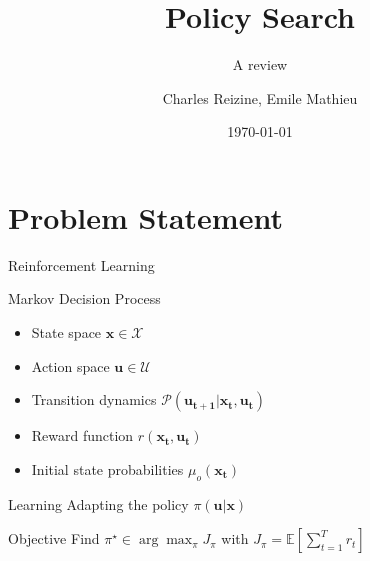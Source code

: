 \documentclass[10pt]{beamer}
\title{Policy Search}
\subtitle{A review}
\date{\today}
\author{Charles Reizine, Emile Mathieu}
\institute{Ecole des Ponts ParisTech}
\begin{document}
\maketitle


\section{Problem Statement}

\begin{frame}{Reinforcement Learning}

\begin{alertblock}{Markov Decision Process}
\begin{itemize}
\item State space $\bm{x} \in \mathcal{X}$
\item Action space $\bm{u} \in \mathcal{U}$
\item Transition dynamics $\mathcal{P}(\bm{u_{t+1}} |\bm{x_{t}}, \bm{u_{t}})$
\item Reward function $r(\bm{x_{t}}, \bm{u_{t}})$
\item Initial state probabilities $\mu_o(\bm{x_{t}})$
\end{itemize}
\end{alertblock}

\begin{alertblock}{Learning}
Adapting the policy $\pi(\bm{u} | \bm{x})$
\end{alertblock}

\begin{alertblock}{Objective}
Find $\pi^\star \in \arg\max_\pi J_\pi$ with $J_\pi = \mathbb{E} \left[ \sum_{t=1}^T r_t \right]$
\end{alertblock}

\end{frame}
\end{document}

